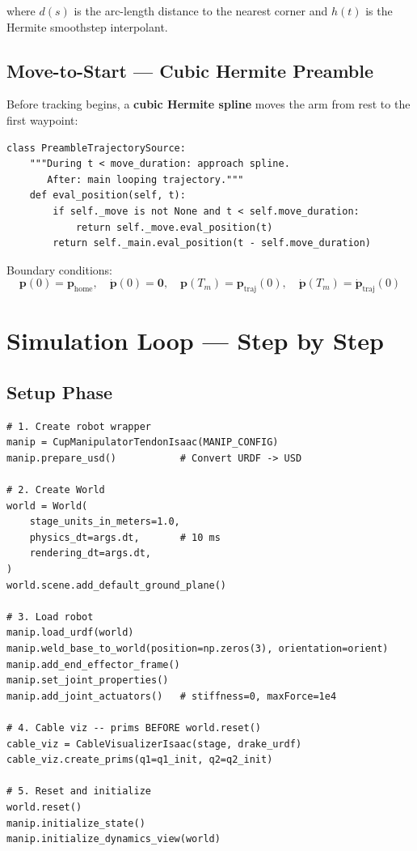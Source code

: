 \documentclass[11pt,a4paper]{article}
\begin{document}
where $d(s)$ is the arc-length distance to the nearest corner and $h(t)$ is the Hermite smoothstep interpolant.

\subsection{Move-to-Start --- Cubic Hermite Preamble}

Before tracking begins, a \textbf{cubic Hermite spline} moves the arm from rest to the first waypoint:

\begin{lstlisting}[caption={Preamble construction --- \texttt{controller/trajectory.py}}]
class PreambleTrajectorySource:
    """During t < move_duration: approach spline.
       After: main looping trajectory."""
    def eval_position(self, t):
        if self._move is not None and t < self.move_duration:
            return self._move.eval_position(t)
        return self._main.eval_position(t - self.move_duration)
\end{lstlisting}

Boundary conditions:
\begin{equation}
    \bm{p}(0) = \bm{p}_{\mathrm{home}}, \quad
    \dot{\bm{p}}(0) = \bm{0}, \quad
    \bm{p}(T_m) = \bm{p}_{\mathrm{traj}}(0), \quad
    \dot{\bm{p}}(T_m) = \dot{\bm{p}}_{\mathrm{traj}}(0)
\end{equation}


\section{Simulation Loop --- Step by Step}
\label{sec:loop}

\subsection{Setup Phase}

\begin{lstlisting}[caption={World and robot setup --- \texttt{script\_cup\_manipulator\_pendulam\_tendon\_computed\_torque\_isaac\_sim.py}}]
# 1. Create robot wrapper
manip = CupManipulatorTendonIsaac(MANIP_CONFIG)
manip.prepare_usd()           # Convert URDF -> USD

# 2. Create World
world = World(
    stage_units_in_meters=1.0,
    physics_dt=args.dt,       # 10 ms
    rendering_dt=args.dt,
)
world.scene.add_default_ground_plane()

# 3. Load robot
manip.load_urdf(world)
manip.weld_base_to_world(position=np.zeros(3), orientation=orient)
manip.add_end_effector_frame()
manip.set_joint_properties()
manip.add_joint_actuators()   # stiffness=0, maxForce=1e4

# 4. Cable viz -- prims BEFORE world.reset()
cable_viz = CableVisualizerIsaac(stage, drake_urdf)
cable_viz.create_prims(q1=q1_init, q2=q2_init)

# 5. Reset and initialize
world.reset()
manip.initialize_state()
manip.initialize_dynamics_view(world)
\end{lstlisting}
\end{document}
